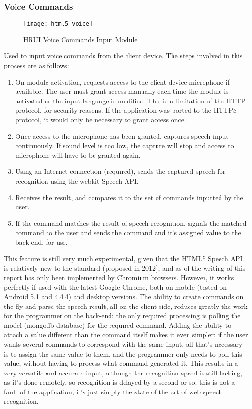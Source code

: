 \subsubsection{Voice Commands} \label{voicecommands}
\begin{figure}[H]
\centering
\captionsetup{justification=centering}
\texttt{[image: html5\_voice]}
\caption{HRUI Voice Commands Input Module}
\end{figure}
Used to input voice commands from the client device. The steps involved in this process are as follows:
\begin{enumerate}
	\item On module activation, requests access to the client device microphone if available. The user must grant access 
	manually each time the module is activated or the input language is modified. This is a limitation of the HTTP protocol, 
	for security reasons. If the application was ported to the HTTPS protocol, it would only be necessary to grant access once.
	\item Once access to the microphone has been granted, captures speech input continuously. If sound level is too low, the 
	capture will stop and access to microphone will have to be granted again.
	\item Using an Internet connection (required), sends the captured speech for recognition using the webkit Speech API.
	\item Receives the result, and compares it to the set of commands inputted by the user.
	\item If the command matches the result of speech recognition, signals the matched command to the user and sends the 
	command and it's assigned value to the back-end, for use.
\end{enumerate}
This feature is still very much experimental, given that the HTML5 Speech API is relatively new to the standard (proposed in 
2012), and as of the writing of this report has only been implemented by Chromium browsers\cite{caniusespeech15}. However, it 
works perfectly if used with the latest Google Chrome, both on mobile (tested on Android 5.1 and 4.4.4) and desktop versions. 
The ability to create commands on the fly and parse the speech result, all on the client side, reduces greatly the work for 
the programmer on the back-end: the only required processing is polling the model (mongodb database) for the required command. 
Adding the ability to attach a value different than the command itself makes it even simpler: if the user wants several 
commands to correspond with the same input, all that's necessary is to assign the same value to them, and the programmer only 
needs to poll this value, without having to process what command generated it. This results in a very versatile and accurate 
input, although the recognition speed is still lacking, as it's done remotely, so recognition is delayed by a second or so. 
this is not a fault of the application, it's just simply the state of the art of web speech recognition.\\

